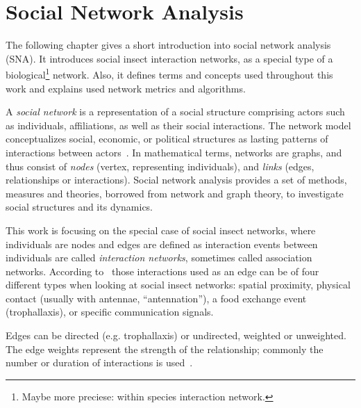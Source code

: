 \section{Social Network Analysis}
\label{ch:bg}
The following chapter gives a short introduction into social network analysis (SNA). It introduces social insect interaction networks, as a special type of a biological\footnote{Maybe more preciese: within species interaction network.} network. Also, it defines terms and concepts used throughout this work and explains used network metrics and algorithms.

A \emph{social network} is a representation of a social structure comprising actors such as individuals, affiliations, as well as their social interactions.
The network model conceptualizes social, economic, or political structures as lasting patterns of interactions between actors~\cite{wasserman1994social}.
In mathematical terms, networks are graphs, and thus consist of \emph{nodes} (vertex, representing individuals), and \emph{links} (edges, relationships or interactions).
Social network analysis provides a set of methods, measures and theories, borrowed from network and graph theory, to investigate social structures and its dynamics.

This work is focusing on the special case of social insect networks, where individuals are nodes and edges are defined as interaction events between individuals are called \emph{interaction networks}, sometimes called association networks.
According to~\textcite{charbonneau2013social} those interactions used as an edge can be of four different types when looking at social insect networks: spatial proximity, physical contact (usually with antennae, “antennation”), a food exchange event (trophallaxis), or specific communication signals.

Edges can be directed (e.g. trophallaxis) or undirected, weighted or unweighted. The edge weights represent the strength of the relationship; commonly the number or duration of interactions is used~\cite{farine2015constructing}.

